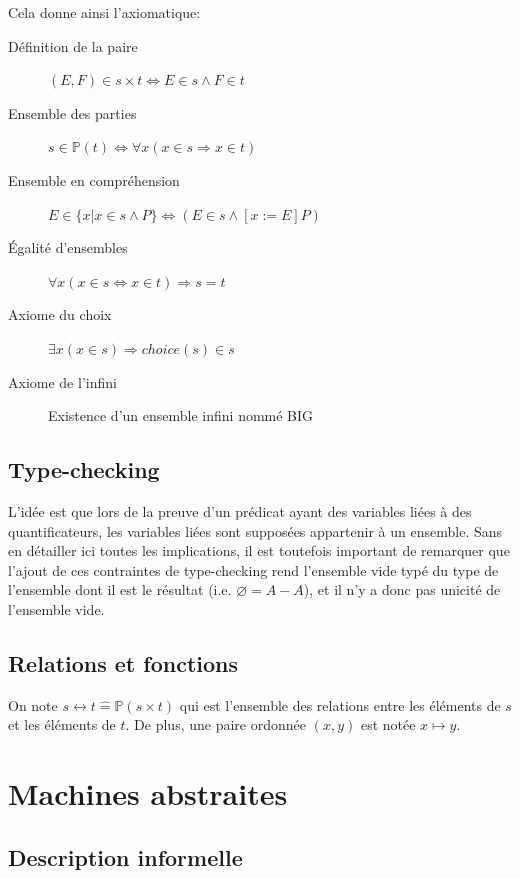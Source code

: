 \documentclass[10pt,a4paper]{article}
\newcommand{\Bequal}{\mathrel{\widehat{=}}}
\begin{document}
Cela donne ainsi l'axiomatique:
\begin{description}
\item[Définition de la paire] $(E, F) \in s \times t \Leftrightarrow E \in s \wedge F \in t$
\item[Ensemble des parties] $s \in \mathbb{P}(t) \Leftrightarrow \forall x (x \in s \Rightarrow x \in t)$
\item[Ensemble en compréhension] $E \in \{ x | x \in s \wedge P \} \Leftrightarrow (E \in s \wedge [x:= E] P)$
\item[Égalité d'ensembles] $\forall x (x \in s \Leftrightarrow x \in t) \Rightarrow s = t$
\item[Axiome du choix] $\exists x  (x \in s) \Rightarrow choice(s) \in s$
\item[Axiome de l'infini] Existence d'un ensemble infini nommé BIG
\end{description}

\subsection{Type-checking}

L'idée est que lors de la preuve d'un prédicat ayant des variables liées à des quantificateurs, les variables liées sont supposées appartenir à un ensemble.
Sans en détailler ici toutes les implications, il est toutefois important de remarquer que l'ajout de ces contraintes de type-checking rend l'ensemble vide typé du type de l'ensemble dont il est le résultat (i.e. $\varnothing = A - A$), et il n'y a donc pas unicité de l'ensemble vide. 

\subsection{Relations et fonctions}

On note  $ s \leftrightarrow t \Bequal \mathbb{P}(s \times t)$ qui est l'ensemble des relations entre les éléments de $s$ et les éléments de $t$. De plus, une paire ordonnée $(x, y)$ est notée $x \mapsto y$.

\section{Machines abstraites}

\subsection{Description informelle}
\end{document}
